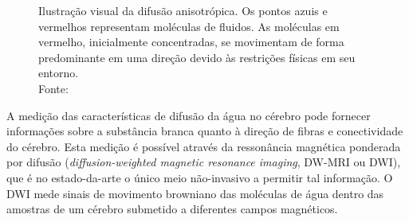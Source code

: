 \documentclass[
    12pt,                %
    oneside,            %
    a4paper,            %
    english,            %
    french,                %
    spanish,            %
    brazil                %
    ]{abntex2}
\begin{document}
\begin{figure}[ht]
\centering
\captionsetup[subfloat]{farskip=0pt,nearskip=0pt}
    \caption{Ilustração visual da difusão anisotrópica. Os pontos azuis e vermelhos representam moléculas de fluidos. As moléculas em vermelho, inicialmente concentradas, se movimentam de forma predominante em uma direção devido às restrições físicas em seu entorno. \\ Fonte: \cite{voltoline2016}
    }
    \label{fig::intro_difusao_anisotropica}
\end{figure}



A medição das características de difusão da água no cérebro pode fornecer informações sobre a substância branca quanto à direção de fibras e conectividade do cérebro. Esta medição é possível através da ressonância magnética ponderada por difusão (\textit{diffusion-weighted magnetic resonance imaging}, DW-MRI ou DWI), que é no estado-da-arte o único meio não-invasivo a permitir tal informação. O DWI mede sinais de movimento browniano das moléculas de água dentro das amostras de um cérebro submetido a diferentes campos magnéticos.
\end{document}
